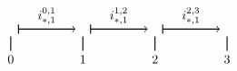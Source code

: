 \documentclass[11pt]{beamer}
\theoremstyle{remark}
\theoremstyle{definition}
\theoremstyle{plain}
\begin{document}
\begin{frame}
\begin{itemize}
\[\begin{tikzpicture}[scale=2]
\begin{scope}[shift={(0,-1)}]
                            \draw[-, thick] (0,0.1) --  (0,-0.1) node[below] {$0$}; 
                            \draw[-, thick] (1,0.1) --  (1,-0.1) node[below] {$1$}; 
                            \draw[-, thick] (2,0.1) --  (2,-0.1) node[below] {$2$}; 
                            \draw[-, thick] (3,0.1) --  (3,-0.1) node[below] {$3$}; 

                            \draw[ |->, thick] (0.1, 0.2) -- (0.9, 0.2) node[midway, above]
                                {$i_{\ast, 1}^{0,1}$};
                            \draw[ |->, thick] (1.1, 0.2) -- (1.9, 0.2) node[midway, above]
                                {$i_{\ast, 1}^{1,2}$};
                            \draw[ |->, thick] (2.1, 0.2) -- (2.9, 0.2) node[midway, above]
                                {$i_{\ast, 1}^{2,3}$};
                        \end{scope}
                    \end{tikzpicture}
                \]
        \end{itemize}
    \end{frame}
\end{document}
